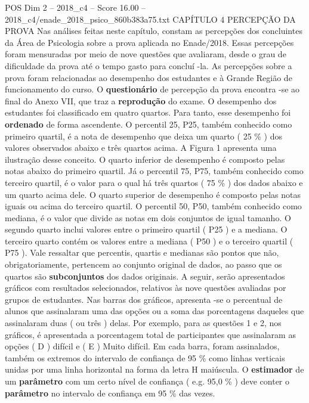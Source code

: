 \begin{textsample}{POS Dim 2 – 2018\_c4 – Score 16.00 – 2018\_c4/enade\_2018\_psico\_860b383a75.txt}  \label{ex:f2_pos_056}
CAPÍTULO 4 PERCEPÇÃO DA PROVA Nas análises feitas neste capítulo, constam as percepções dos concluintes da Área de Psicologia sobre a prova aplicada no Enade/2018.
Essas percepções foram mensuradas por meio de nove questões que avaliaram, desde o grau de dificuldade da prova até o tempo gasto para concluí -la.
As percepções sobre a prova foram relacionadas ao desempenho dos estudantes e à Grande Região de funcionamento do curso.
O \textbf{questionário} de percepção da prova encontra -se ao final do Anexo VII, que traz a \textbf{reprodução} do exame.
O desempenho dos estudantes foi classificado em quatro quartos.
Para tanto, esse desempenho foi \textbf{ordenado} de forma ascendente.
O percentil 25, P25, também conhecido como primeiro quartil, é a nota de desempenho que deixa um quarto ( 25 \% ) dos valores observados abaixo e três quartos acima.
A Figura 1 apresenta uma ilustração desse conceito.
O quarto inferior de desempenho é composto pelas notas abaixo do primeiro quartil.
Já o percentil 75, P75, também conhecido como terceiro quartil, é o valor para o qual há três quartos ( 75 \% ) dos dados abaixo e um quarto acima dele.
O quarto superior de desempenho é composto pelas notas iguais ou acima do terceiro quartil.
O percentil 50, P50, também conhecido como mediana, é o valor que divide as notas em dois conjuntos de igual tamanho.
O segundo quarto inclui valores entre o primeiro quartil ( P25 ) e a mediana.
O terceiro quarto contém os valores entre a mediana ( P50 ) e o terceiro quartil ( P75 ).
Vale ressaltar que percentis, quartis e medianas são pontos que não, obrigatoriamente, pertencem ao conjunto original de dados, ao passo que os quartos são \textbf{subconjuntos} dos dados originais.
A seguir, serão apresentados gráficos com resultados selecionados, relativos às nove questões avaliadas por grupos de estudantes.
Nas barras dos gráficos, apresenta -se o percentual de alunos que assinalaram uma das opções ou a soma das porcentagens daqueles que assinalaram duas ( ou três ) delas.
Por exemplo, para as questões 1 e 2, nos gráficos, é apresentada a porcentagem total de participantes que assinalaram as opções ( D ) difícil e ( E ) Muito difícil.
Em cada barra, foram assinalados, também os extremos do intervalo de confiança de 95 \% como linhas verticais unidas por uma linha horizontal na forma da letra H maiúscula.
O \textbf{estimador} de um \textbf{parâmetro} com um certo nível de confiança ( e.g. 95,0 \% ) deve conter o \textbf{parâmetro} no intervalo de confiança em 95 \% das vezes.

\end{textsample}

